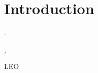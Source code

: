 %
%
%
%
%

%
%
%
%
%

\chapter{Introduction} \label{ch:introduction}

.

\cite{test}, \cite{obdh2}

LEO
